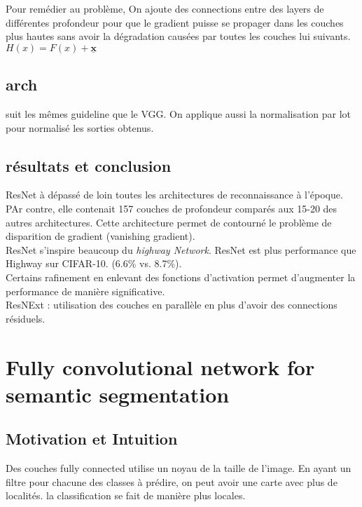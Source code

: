 \documentclass[oneside]{book}
\begin{document}
Pour remédier au problème, On ajoute des connections entre des layers de différentes profondeur pour que le gradient puisse se propager dans les couches plus hautes sans avoir la dégradation causées par toutes les couches lui suivants.\\

$H(x) = F(x) + \underline{\textbf{x}}$\\

\subsection{arch}
suit les mêmes guideline que le VGG. On applique aussi la normalisation par lot pour normalisé les sorties obtenus. 

\subsection{résultats et conclusion}

ResNet à dépassé de loin toutes les architectures de reconnaissance à l'époque. PAr contre, elle contenait 157 couches de profondeur comparés aux 15-20 des autres architectures. Cette architecture permet de contourné le problème de disparition de gradient (vanishing gradient).\\

ResNet s'inspire beaucoup du \textit{highway Network}. ResNet est plus performance que Highway sur CIFAR-10. (6.6\% vs. 8.7\%). \\

Certains rafinement en enlevant des fonctions d'activation permet d'augmenter la performance de manière significative.\\

ResNExt : utilisation des couches en parallèle en plus d'avoir des connections résiduels. 
\section{Fully convolutional network for semantic segmentation}

\subsection{Motivation et Intuition}
Des couches fully connected utilise un noyau de la taille de l'image. En ayant un filtre pour chacune des classes à prédire, on peut avoir une carte avec plus de localités. la classification se fait de manière plus locales. \\
\end{document}

